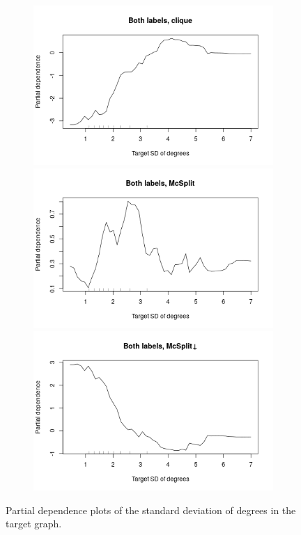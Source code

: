 \documentclass{l4proj}
\theoremstyle{definition}
\theoremstyle{remark}
\begin{document}
\begin{figure}
\begin{subfigure}[t]{0.49\textwidth}
  \end{subfigure}
  \begin{subfigure}[t]{0.49\textwidth}
    \centering
    \includegraphics[width=\textwidth]{images/both_labels_clique_stddeg.png}
    \includegraphics[width=\textwidth]{images/both_labels_mcsplit_stddeg.png}
    \includegraphics[width=\textwidth]{images/both_labels_mcsplitdown_stddeg.png}
  \end{subfigure}
  \caption{Partial dependence plots of the standard deviation of degrees in the
    target graph.}
  \label{fig:stddeg_partials}
\end{figure}
\end{document}
